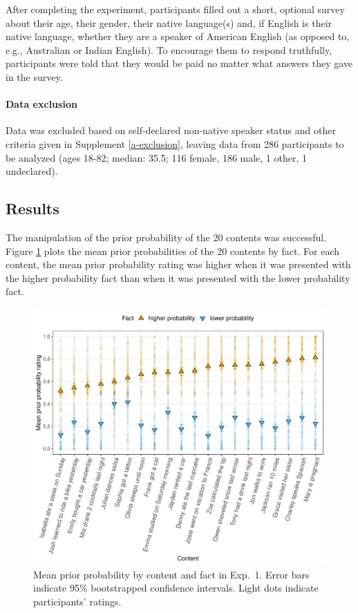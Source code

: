 \documentclass[11pt,fleqn]{article}
\newcommand{\6}{\mbox{$[\hspace*{-.6mm}[$}}
\newcommand{\9}{\mbox{$]\hspace*{-.6mm}]$}}
\begin{document}
After completing the experiment, participants filled out a short, optional survey about their age, their gender, their native language(s) and, if English is their native language, whether they are a speaker of American English (as opposed to, e.g., Australian or Indian English). To encourage them to respond truthfully, participants were told that they would be paid no matter what answers they gave in the survey.

\paragraph{Data exclusion} Data was excluded based on self-declared non-native speaker status and other criteria given in Supplement \ref{a-exclusion}, leaving data from 286 participants to be analyzed (ages 18-82; median: 35.5; 116 female, 186 male, 1 other, 1 undeclared).

\subsection{Results}

The manipulation of the prior probability of the 20 contents was successful. Figure \ref{f-prior} plots the mean prior probabilities of the 20 contents by fact. For each content, the mean prior probability rating was higher when it was presented with the higher probability fact than when it was presented with the lower probability fact.

\begin{figure}[h!]
\centering
\includegraphics[width=.7\paperwidth]{../../results/9-prior-projection/graphs/prior-ratings}

\caption{Mean prior probability by content and fact in Exp.~1. Error bars indicate 95\% bootstrapped confidence intervals. Light dots indicate participants' ratings.} 
\label{f-prior}
\end{figure}
\end{document}
